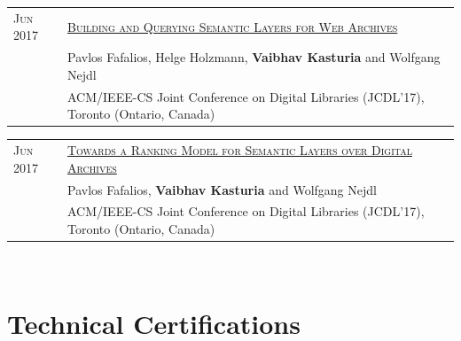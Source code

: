 \documentclass[a4paper,10pt]{article} %
\begin{document}
\begin{tabular}{ll}

\textsc{Jun 2017} & \href{http://ieeexplore.ieee.org/document/7991555/}{\textsc{Building and Querying Semantic Layers for Web Archives}}\\
& Pavlos Fafalios, Helge Holzmann, \textbf{Vaibhav Kasturia} and Wolfgang Nejdl\\
& ACM/IEEE-CS Joint Conference on Digital Libraries (JCDL’17), Toronto (Ontario, Canada)\\
\end{tabular}

\begin{tabular}{ll}
\textsc{Jun 2017} & \href{http://ieeexplore.ieee.org/document/7991617/}{\textsc{Towards a Ranking Model for Semantic Layers over 
Digital Archives}}\\
& Pavlos Fafalios, \textbf{Vaibhav Kasturia} and Wolfgang Nejdl\\
& ACM/IEEE-CS Joint Conference on Digital Libraries (JCDL’17), Toronto (Ontario, Canada)\\
\end{tabular}
\\

\section{Technical Certifications}
\end{document}
